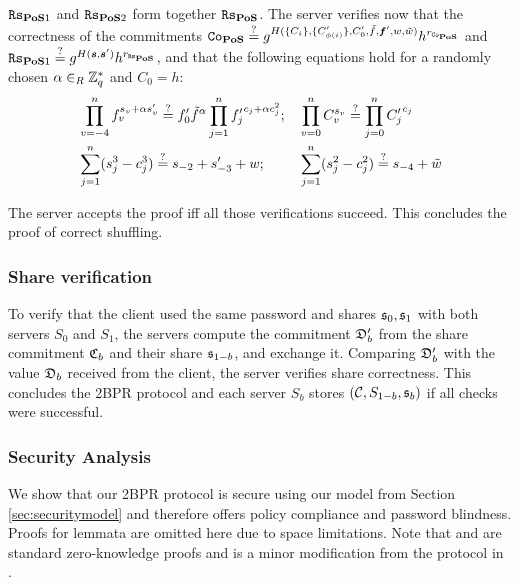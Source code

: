 \noindent
$\mathtt{Rs}_{\mathsf{\bf PoS}1}$ and $\mathtt{Rs}_{\mathsf{\bf PoS}2}$ form together $\mathtt{Rs}_{\mathsf{\bf PoS}}$.
The server verifies now that the correctness of the commitments
$\mathtt{Co}_\mathsf{\bf PoS} \stackrel{?}{=} g^{H(\{C_i\}, \{C'_{\phi(i)}\}, C'_0, \tilde{f}, \bm f', w, \tilde{w})} h^{r_{\mathtt{Co}_\mathsf{\bf PoS}}}$ and
$\mathtt{Rs}_{\mathsf{\bf PoS}1} \stackrel{?}{=} g^{H(\bm s, \bm s')} h^{r_{\mathtt{Rs}_\mathsf{\bf PoS}}}$,
and that the following equations hold for a randomly chosen $\alpha\in_R\mathbb{Z}^\ast_q$ and $C_0=h$:
\begin{align*}
  & \prod_{v=-4}^{n} f_v^{s_v+\alpha s'_v}  \stackrel{?}{=}  f'_0\tilde{f}^\alpha \prod_{j=1}^n {f'_j}^{c_j+\alpha c_j^2};
  &&  \prod_{v=0}^n C_v^{s_v}  \stackrel{?}{=}  \prod_{j=0}^n {C'_j}^{c_j} \\
  & \sum_{j=1}^n (s_j^3 - c_j^3)  \stackrel{?}{=}  s_{-2} + s'_{-3} + w;
  &&  \sum_{j=1}^n (s_j^2 - c_j^2)  \stackrel{?}{=}  s_{-4} + \tilde{w} 
\end{align*}

\noindent
The server accepts the proof iff all those verifications succeed.
This concludes the proof of correct shuffling.

\subsubsection{Share verification}
To verify that the client used the same password \pwd and shares $\mathfrak{s}_0,\mathfrak{s}_1$ with both servers $S_0$ and $S_1$, the servers compute the commitment $\mathfrak{D}'_b$ from the share commitment $\mathfrak{C}_b$ and their share $\mathfrak{s}_{1-b}$, and exchange it.
Comparing $\mathfrak{D}'_b$ with the value $\mathfrak{D}_b$ received from the client, the server verifies share correctness.
This concludes the 2BPR protocol and each server $S_b$ stores $(\mathcal{C},S_{1-b},\mathfrak{s}_b)$ if all checks were successful.

\subsubsection{Security Analysis}
We show that our 2BPR protocol is secure using our model from Section \ref{sec:securitymodel} and therefore offers policy compliance and password blindness.
Proofs for lemmata are omitted here due to space limitations.
Note that \PoM and \PoC are standard zero-knowledge proofs and \PoS is a minor modification from the protocol in \cite{FurukawaS01,Furukawa05}.

